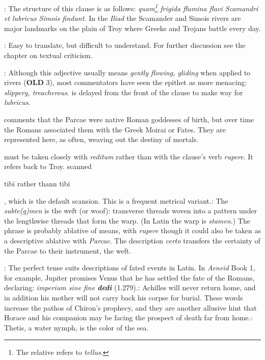 
: The structure of this clause is as follows: \textit{quam\footnote{The relative refers to \textit{tellus}.} frigida flumina flavi Scamandri et lubricus Simois findunt.}  In the \textit{Iliad} the Scamander and Simois rivers are major landmarks on the plain of Troy where Greeks and Trojans battle every day.


: Easy to translate, but difficult to understand.  For further discussion see the chapter on textual criticism.


: Although this adjective usually means \textit{gently flowing, gliding} when applied to rivers (\textbf{OLD} 3), most commentators have seen the epithet as more menacing: \textit{slippery, treacherous}.\indent{} is delayed from the front of the clause to make way for \textit{lubricus}.


\citet[224--225]{mankin1995} comments that the Parcae were native Roman goddesses of birth, but over time the Romans associated them with the Greek Moirai or Fates.  They are represented here, as often, weaving out the destiny of mortals.


 must be taken closely with \textit{reditum} rather than with the clause's verb \textit{rupere}.  It refers back to Troy.\indent{} scanned \begin{metrica}t\-ib\=i rather thann t\-ib\-i\end{metrica}, which is the default scansion.  This is a frequent metrical variant.\indent{}: The \textit{subte(g)men} is the weft (or woof): transverse threads woven into a pattern under the lengthwise threads that form the warp.  (In Latin the warp is \textit{stamen}.)  The phrase is probably ablative of means, with \textit{rupere} though it could also be taken as a descriptive ablative with \textit{Parcae}.  The description \textit{certo} transfers the certainty of the Parcae to their instrument, the weft.


: The perfect tense suits descriptions of fated events in Latin.  In \textit{Aeneid} Book 1, for example, Jupiter promises Venus that he has settled the fate of the Romans, declaring: \textit{imperium sine fine \textbf{dedi}} (1.279).\indent{}: Achilles will never return home, and in addition his mother will not carry back his corpse for burial.  These words increase the pathos of Chiron's prophecy, and they are another allusive hint that Horace and his companion may be facing the prospect of death far from home.\indent{}: Thetis, a water nymph, is the color of the sea.

